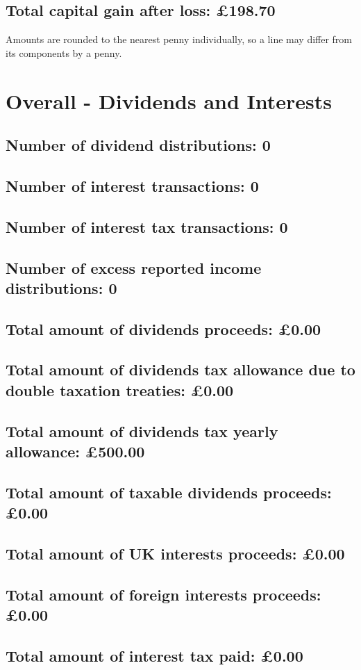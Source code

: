 \documentclass{article}
\begin{document}
\subsection*{Total capital gain after loss: £198.70}
\vspace{1em}
Amounts are rounded to the nearest penny individually, so a line may differ from its components by a penny.
\vspace{2em}
\section*{Overall - Dividends and Interests}
\subsection*{Number of dividend distributions: 0}
\subsection*{Number of interest transactions: 0}
\subsection*{Number of interest tax transactions: 0}
\subsection*{Number of excess reported income distributions: 0}
\subsection*{Total amount of dividends proceeds: £0.00}
\subsection*{Total amount of dividends tax allowance due to double taxation treaties: £0.00}
\subsection*{Total amount of dividends tax yearly allowance: £500.00}
\subsection*{Total amount of taxable dividends proceeds: £0.00}
\subsection*{Total amount of UK interests proceeds: £0.00}
\subsection*{Total amount of foreign interests proceeds: £0.00}
\subsection*{Total amount of interest tax paid: £0.00}
\end{document}
